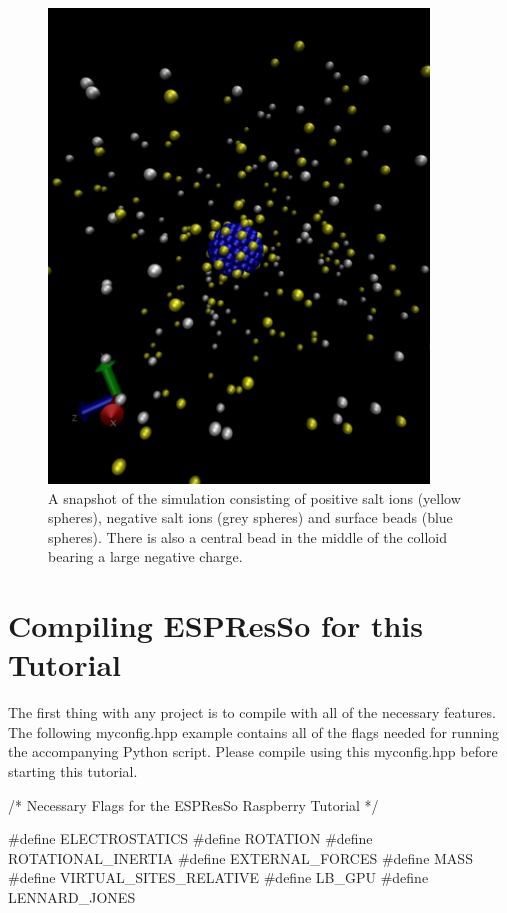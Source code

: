 \documentclass[
paper=a4,                       %
fontsize=11pt,                  %
twoside,                        %
footsepline,                    %
headsepline,                    %
headinclude=false,              %
footinclude=false,              %
pagesize,                       %
]{scrartcl}
\begin{document}
\begin{figure}[]
	\centering
	\includegraphics[width=0.9\textwidth]{figures/raspberry_snapshot}
	\caption{A snapshot of the simulation consisting of positive salt ions (yellow spheres), negative salt ions (grey spheres) and surface beads (blue spheres). There is also a central bead in the middle of the colloid bearing a large negative  charge.}
	\label{fig:rasp_snapshot}
\end{figure} 

\section{Compiling ESPResSo for this Tutorial}\label{sec:compiler_flags}
The first thing with any \es{} project is to compile \es{} with all of the necessary features.
The following myconfig.hpp example contains all of the flags needed for running the accompanying Python script.
Please compile \es{} using this myconfig.hpp before starting this tutorial.
{\small\vspace{0,2cm}
\begin{pypresso}[numbers=none]
/* Necessary Flags for the ESPResSo Raspberry Tutorial */

#define ELECTROSTATICS
#define ROTATION
#define ROTATIONAL_INERTIA
#define EXTERNAL_FORCES
#define MASS
#define VIRTUAL_SITES_RELATIVE
#define LB_GPU
#define LENNARD_JONES
\end{pypresso}\vspace{0,2cm}
}
\end{document}
